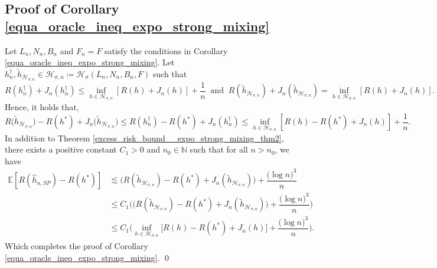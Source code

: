 \documentclass[10pt,twoside]{article}
\numberwithin{equation}{section}
\newcommand{\E}{\ensuremath{\mathbb{E}}}
\newcommand{\N}{\ensuremath{\mathbb{N}}}
\begin{document}
\subsection{Proof of Corollary \ref{equa_oracle_ineq_expo_strong_mixing} }
%
Let $L_n, N_n, B_n$ and $F_n = F$ satisfy the conditions in Corollary \ref{equa_oracle_ineq_expo_strong_mixing}.
%
%
Let  $h_{n}^{\dagger}, \widetilde{h}_{\mathcal{H}_{\sigma, n}} \in \mathcal{H}_{\sigma, n} \coloneqq \mathcal{H}_{\sigma}(L_n, N_n, B_n, F)$ such that  
%
\begin{equation*} 
R (h_{n}^{\dagger})  + J_n(h_{n}^{\dagger}) \leq \underset{h \in \mathcal{H}_{\sigma, n}} {\inf} \left[ R(h)  + J_n(h) \right] + \dfrac{1}{n} ~ \text{ and } ~ R (\widetilde{h}_{\mathcal{H}_{\sigma, n}})  + J_n(\widetilde{h}_{\mathcal{H}_{\sigma, n}}) = \underset{h \in \mathcal{H}_{\sigma, n}} {\inf} \left[ R(h)  + J_n(h) \right].
\end{equation*}
%
Hence, it holds that,
%
\begin{equation}\label{bound_approxi_err_v2}
  R \big(\widetilde{h}_{\mathcal{H}_{\sigma, n}} \big) - R(h^*) + J_n \big( \widetilde{h}_{\mathcal{H}_{\sigma, n}} \big)  \leq  R(h_{n}^{\dagger})  - R(h^*)+ J_n(h_{n}^{\dagger})   \leq \underset{h \in \mathcal{H}_{\sigma, n}} {\inf} \left[ R(h) - R(h^*)  + J_n(h) \right] + \dfrac{1}{n}.  
\end{equation}
%
In addition to Theorem \ref{excess_risk_bound__expo_strong_mixing_thm2}, there exists a positive constant $C_1 > 0$ and $n_0\in \N$ such that for all $n > n_0$, we have
%
\begin{align}\label{bound_approxi_error}
\nonumber \E[R(\widehat{h}_{n,SP}) - R(h^*) ] & \lesssim  \big(R(\widetilde{h}_{\mathcal{H}_{\sigma, n}}) - R(h^*) + J_n(\widetilde{h}_{\mathcal{H}_{\sigma, n}})\big) + \dfrac{\big(\log n\big)^3}{n}
\\
\nonumber & \leq C_1\Bigg(\big(R(\widetilde{h}_{\mathcal{H}_{\sigma, n}}) - R(h^*) + J_n(\widetilde{h}_{\mathcal{H}_{\sigma, n}})\big) + \dfrac{\big(\log n\big)^3}{n} \Bigg)
\\
 &  \leq C_1\Bigg(\underset{h \in \mathcal{H}_{\sigma, n}} {\inf} \Big[ R(h) - R(h^*)   + J_n(h) \Big] +  \dfrac{\big(\log n\big)^3}{n} \Bigg).
\end{align}
% 
%
%
Which completes the proof  of Corollary \ref{equa_oracle_ineq_expo_strong_mixing}.
%
\qed

\medskip
\end{document}
